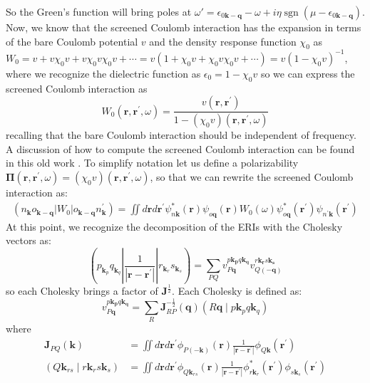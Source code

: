     So the Green's function will bring poles at \(\omega' = \epsilon_{0 \mathbf{k-q}} - \omega+ i\eta\operatorname{sgn}(\mu - \epsilon_{0 \mathbf{k-q}})\).
    Now, we know that the screened Coulomb interaction has the expansion in terms of the bare Coulomb potential \(v\) and the density response function \(\chi_0\) as \(W_0 = v + v\chi_0 v + v\chi_0 v\chi_0 v + \cdots = v\left(1 + \chi_0 v + \chi_0 v \chi_0 v + \cdots\right) = v\left(1 - \chi_0 v\right)^{-1}\), where we recognize the dielectric function as \(\epsilon_0 = 1 - \chi_0 v\) so we can express the screened Coulomb interaction as
    \begin{equation}
    W_0(\mathbf{r}, \mathbf{r}^{\prime}, \omega) = \frac{v(\mathbf{r}, \mathbf{r}^{\prime})}{1 - \left(\chi_0v\right)(\mathbf{r}, \mathbf{r}^{\prime}, \omega)}
    \end{equation}
    recalling that the bare Coulomb interaction should be independent of frequency. A discussion of how to compute the screened Coulomb interaction can be found in this old work \cite{Onida2002-pw}. To simplify notation let us define a polarizability $\boldsymbol{\Pi}\left(\mathbf{r}, \mathbf{r}^{\prime}, \omega\right) = \left(\chi_0 v\right)(\mathbf{r}, \mathbf{r}^{\prime}, \omega)$, so that we can rewrite the screened Coulomb interaction as:
\begin{align}
    (n_{\mathbf{k}}o_{\mathbf{k-q}}|W_0|o_{\mathbf{k-q}}n^\prime_{\mathbf{k}}) = \iint d \mathbf{r} d \mathbf{r}^\prime \psi_{n\mathbf{k}}^{*}(\mathbf{r}) \psi_{o \mathbf{q}}(\mathbf{r}) W_0(\omega ) \psi_{o \mathbf{q}}^{*}\left(\mathbf{r}^{\prime}\right) \psi_{n^\prime\mathbf{k}}(\mathbf{r}^\prime)
\end{align}
At this point, we recognize the decomposition of the ERIs with the Cholesky vectors as:
\begin{equation}
    (p_{\mathbf{k}_p} q_{\mathbf{k}_q} |\frac{1}{|\mathbf{r}-\mathbf{r}^\prime|} |r_{\mathbf{k}_r} s_{\mathbf{k}_s}) = \sum_{PQ} v_{P{\mathbf{q}}}^{p\mathbf{k_p}q\mathbf{k_q}} v_{Q{(\mathbf{-q})}}^{r\mathbf{k_r}s\mathbf{k_s}}
\end{equation}
so each Cholesky brings a factor of $\mathbf{J}^{\frac{1}{2}}$. Each Cholesky is defined as:
\begin{equation}
    v_{P{\mathbf{q}}}^{p\mathbf{k_p}q\mathbf{k_q}} = \sum_{R} \mathbf{J}_{RP}^{-\frac{1}{2}}(\mathbf{q}) \left(R \mathbf{q} \mid p \mathbf{k}_p q \mathbf{k}_q\right)
\end{equation}
where
\begin{equation}
\begin{aligned}
\mathbf{J}_{PQ}(\mathbf{k}) & =\iint d \mathbf{r} d \mathbf{r}^{\prime} \phi_{P(-\mathbf{k})}(\mathbf{r}) \frac{1}{\left|\mathbf{r}-\mathbf{r}^{\prime}\right|} \phi_{Q \mathbf{k}}\left(\mathbf{r}^{\prime}\right) \\
\left(Q \mathbf{k}_{r s} \mid r \mathbf{k}_r s \mathbf{k}_s\right) & =\iint d \mathbf{r} d \mathbf{r}^{\prime} \phi_{Q \mathbf{k}_{r s}}(\mathbf{r}) \frac{1}{\left|\mathbf{r}-\mathbf{r}^{\prime}\right|} \phi_{r \mathbf{k}_r}^*\left(\mathbf{r}^{\prime}\right) \phi_{s \mathbf{k}_s}\left(\mathbf{r}^{\prime}\right)
\end{aligned}
\end{equation}
